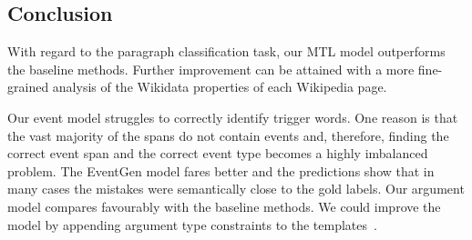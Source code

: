 \documentclass[runningheads]{llncs}
\begin{document}
\vspace*{-10mm}

\subsection{Conclusion}

With regard to the paragraph classification task, our MTL model outperforms the baseline methods. Further improvement can be attained with a more fine-grained analysis of the Wikidata properties of each Wikipedia page.

Our event model struggles to correctly identify trigger words. One reason is that the vast majority of the spans do not contain events and, therefore, finding the correct event span and the correct event type becomes a highly imbalanced problem. The EventGen model fares better and the predictions show that in many cases the mistakes were semantically close to the gold labels. Our argument model compares favourably with the baseline methods. We could improve the model by appending argument type constraints to the templates~\cite{li-etal-2021-genarg, shwartz-etal-2020-unsupervised}.



\end{document}
